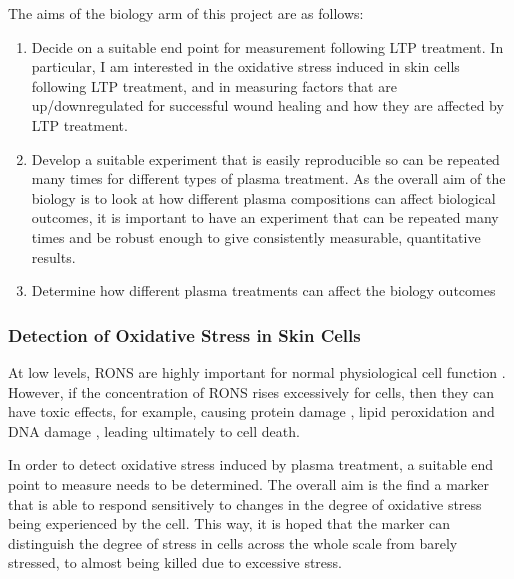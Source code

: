 \documentclass[11pt, oneside]{article}   	%
\begin{document}
The aims of the biology arm of this project are as follows:
\begin{enumerate}
\item Decide on a suitable end point for measurement following LTP treatment. In particular, I am interested in the oxidative stress induced in skin cells following LTP treatment, and in measuring factors that are up/downregulated for successful wound healing and how they are affected by LTP treatment.
\item Develop a suitable experiment that is easily reproducible so can be repeated many times for different types of plasma treatment. As the overall aim of the biology is to look at how different plasma compositions can affect biological outcomes, it is important to have an experiment that can be repeated many times and be robust enough to give consistently measurable, quantitative results.
\item Determine how different plasma treatments can affect the biology outcomes
\end{enumerate}



\subsubsection{Detection of Oxidative Stress in Skin Cells}

At low levels, RONS are highly important for normal physiological cell function \cite{Fang2004antimicrobial, Thannickal2000reactive}.
However, if the concentration of RONS rises excessively for cells, then they can have toxic effects, for example, causing protein damage \cite{PhamHuy2008free}, lipid peroxidation \cite{Ayala2014lipid} and DNA damage \cite{Dizdaroglu2012oxidatively}, leading ultimately to cell death.

In order to detect oxidative stress induced by plasma treatment, a suitable end point to measure needs to be determined.
The overall aim is the find a marker that is able to respond sensitively to changes in the degree of oxidative stress being experienced by the cell.
This way, it is hoped that the marker can distinguish the degree of stress in cells across the whole scale from barely stressed, to almost being killed due to excessive stress.
\end{document}
